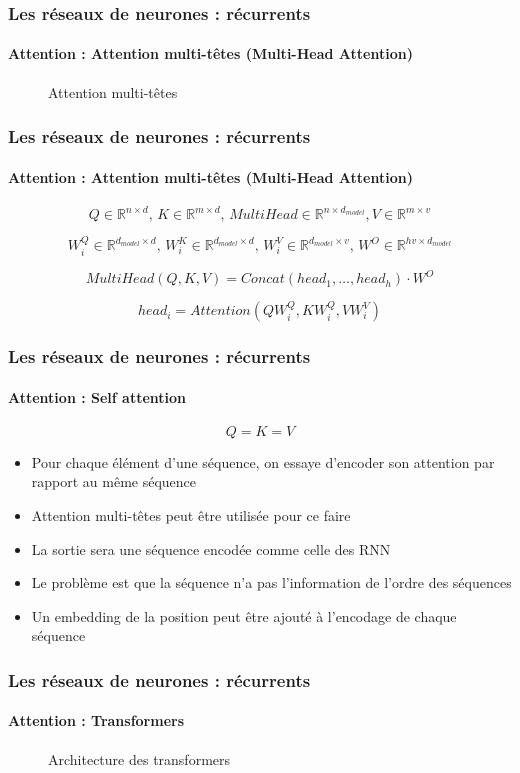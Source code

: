 \documentclass[xcolor=table]{beamer}
\begin{document}
\begin{frame}
	\frametitle{Les réseaux de neurones : récurrents}
	\framesubtitle{Attention : Attention multi-têtes (Multi-Head Attention)}
	\vspace{-0.5cm}
	\begin{figure}
		\centering
		\caption{Attention multi-têtes \cite{2017-vaswani-al}}
	\end{figure}
	
\end{frame}

\begin{frame}
	\frametitle{Les réseaux de neurones : récurrents}
	\framesubtitle{Attention : Attention multi-têtes (Multi-Head Attention)}
	
	\[Q \in \mathbb{R}^{n \times d}, \, K \in \mathbb{R}^{m \times d}, \, MultiHead \in \mathbb{R}^{n \times d_{model}}, V \in \mathbb{R}^{m \times v} \]
	
	\[W^Q_i \in \mathbb{R}^{d_{model} \times d}, \,  W^K_i \in \mathbb{R}^{d_{model} \times d}, \, W^V_i \in \mathbb{R}^{d_{model} \times v}, \, W^O \in \mathbb{R}^{hv \times d_{model}}\]
	
	
	\[MultiHead(Q, K, V) = Concat(head_1, \ldots, head_h) \cdot W^O\]
	
	\[head_i = Attention(Q W^Q_i, K W^Q_i, V W^V_i)\]
	
	
\end{frame}

\begin{frame}
	\frametitle{Les réseaux de neurones : récurrents}
	\framesubtitle{Attention : Self attention}
	
	\[Q = K = V\]
	
	\begin{itemize}
		\item Pour chaque élément d'une séquence, on essaye d'encoder son attention par rapport au même séquence
		\item Attention multi-têtes peut être utilisée pour ce faire
		\item La sortie sera une séquence encodée comme celle des RNN
		\item Le problème est que la séquence n'a pas l'information de l'ordre des séquences 
		\item Un embedding de la position peut être ajouté à l'encodage de chaque séquence
	\end{itemize}
	
\end{frame}


\begin{frame}
	\frametitle{Les réseaux de neurones : récurrents}
	\framesubtitle{Attention : Transformers}
	\vspace{-0.4cm}
	\begin{figure}
		\centering
		\caption{Architecture des transformers \cite{2017-vaswani-al}}
	\end{figure}
	
\end{frame}


\end{document}
